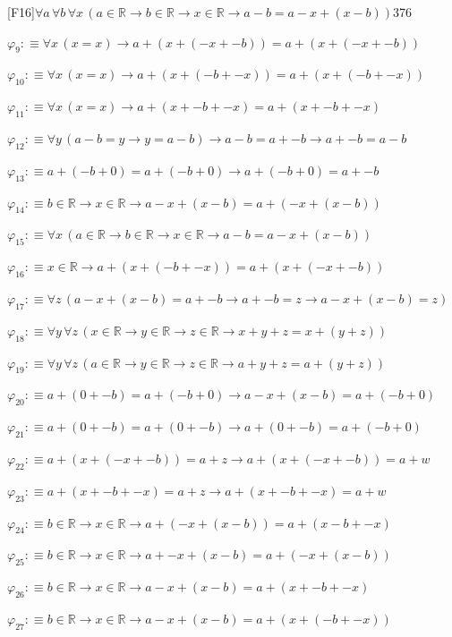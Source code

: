 \begin{fullproof}{[F16]}{$\forall a\,\forall b\,\forall x\,(a \in \mathbb{R} \to b \in \mathbb{R} \to x \in \mathbb{R} \to a - b = a - x + (x - b))$}{376}
\begin{abbrevlist}
\item $\varphi_{9} :\equiv \forall x\,(x = x) \to a + (x + (-x + -b)) = a + (x + (-x + -b))$
\item $\varphi_{10} :\equiv \forall x\,(x = x) \to a + (x + (-b + -x)) = a + (x + (-b + -x))$
\item $\varphi_{11} :\equiv \forall x\,(x = x) \to a + (x + -b + -x) = a + (x + -b + -x)$
\item $\varphi_{12} :\equiv \forall y\,(a - b = y \to y = a - b) \to a - b = a + -b \to a + -b = a - b$
\item $\varphi_{13} :\equiv a + (-b + 0) = a + (-b + 0) \to a + (-b + 0) = a + -b$
\item $\varphi_{14} :\equiv b \in \mathbb{R} \to x \in \mathbb{R} \to a - x + (x - b) = a + (-x + (x - b))$
\item $\varphi_{15} :\equiv \forall x\,(a \in \mathbb{R} \to b \in \mathbb{R} \to x \in \mathbb{R} \to a - b = a - x + (x - b))$
\item $\varphi_{16} :\equiv x \in \mathbb{R} \to a + (x + (-b + -x)) = a + (x + (-x + -b))$
\item $\varphi_{17} :\equiv \forall z\,(a - x + (x - b) = a + -b \to a + -b = z \to a - x + (x - b) = z)$
\item $\varphi_{18} :\equiv \forall y\,\forall z\,(x \in \mathbb{R} \to y \in \mathbb{R} \to z \in \mathbb{R} \to x + y + z = x + (y + z))$
\item $\varphi_{19} :\equiv \forall y\,\forall z\,(a \in \mathbb{R} \to y \in \mathbb{R} \to z \in \mathbb{R} \to a + y + z = a + (y + z))$
\item $\varphi_{20} :\equiv a + (0 + -b) = a + (-b + 0) \to a - x + (x - b) = a + (-b + 0)$
\item $\varphi_{21} :\equiv a + (0 + -b) = a + (0 + -b) \to a + (0 + -b) = a + (-b + 0)$
\item $\varphi_{22} :\equiv a + (x + (-x + -b)) = a + z \to a + (x + (-x + -b)) = a + w$
\item $\varphi_{23} :\equiv a + (x + -b + -x) = a + z \to a + (x + -b + -x) = a + w$
\item $\varphi_{24} :\equiv b \in \mathbb{R} \to x \in \mathbb{R} \to a + (-x + (x - b)) = a + (x - b + -x)$
\item $\varphi_{25} :\equiv b \in \mathbb{R} \to x \in \mathbb{R} \to a + -x + (x - b) = a + (-x + (x - b))$
\item $\varphi_{26} :\equiv b \in \mathbb{R} \to x \in \mathbb{R} \to a - x + (x - b) = a + (x + -b + -x)$
\item $\varphi_{27} :\equiv b \in \mathbb{R} \to x \in \mathbb{R} \to a - x + (x - b) = a + (x + (-b + -x))$

\end{abbrevlist}
\end{fullproof}
